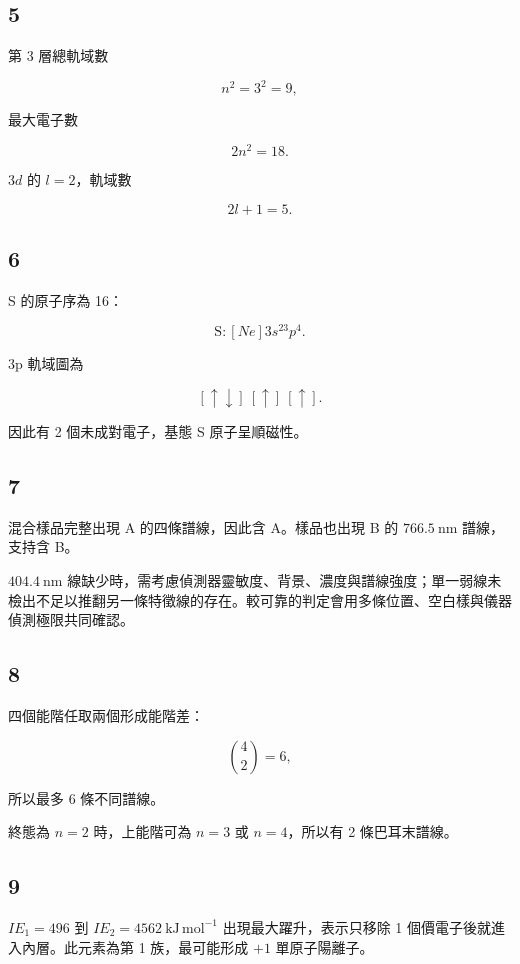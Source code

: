 \documentclass[11pt,a4paper]{article}
\begin{document}
\subsection{5}\label{section-4}

第 3 層總軌域數

\[
n^2=3^2=9,
\]

最大電子數

\[
2n^2=18.
\]

\(3d\) 的 \(l=2\)，軌域數

\[
2l+1=5.
\]

\subsection{6}\label{section-5}

S 的原子序為 16：

\[
\mathrm S:[Ne]3s^23p^4.
\]

3p 軌域圖為

\[
[\uparrow\downarrow]\ [\uparrow]\ [\uparrow].
\]

因此有 2 個未成對電子，基態 S 原子呈順磁性。

\subsection{7}\label{section-6}

混合樣品完整出現 A 的四條譜線，因此含 A。樣品也出現 B 的 \(766.5\ \mathrm{nm}\) 譜線，支持含 B。

\(404.4\ \mathrm{nm}\) 線缺少時，需考慮偵測器靈敏度、背景、濃度與譜線強度；單一弱線未檢出不足以推翻另一條特徵線的存在。較可靠的判定會用多條位置、空白樣與儀器偵測極限共同確認。

\subsection{8}\label{section-7}

四個能階任取兩個形成能階差：

\[
\binom42=6,
\]

所以最多 6 條不同譜線。

終態為 \(n=2\) 時，上能階可為 \(n=3\) 或 \(n=4\)，所以有 2 條巴耳末譜線。

\subsection{9}\label{section-8}

\(IE_1=496\) 到 \(IE_2=4562\ \mathrm{kJ\,mol^{-1}}\) 出現最大躍升，表示只移除 1 個價電子後就進入內層。此元素為第 1 族，最可能形成 \(+1\) 單原子陽離子。
\end{document}
